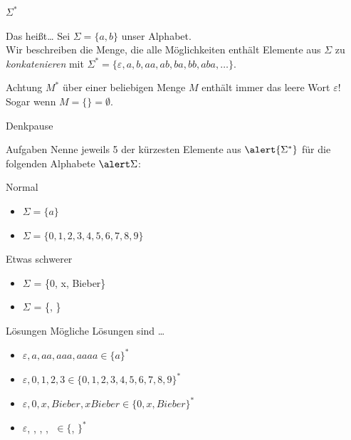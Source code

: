 \documentclass[10pt]{beamer}
\newcommand{\emptyWord}{\varepsilon}
\begin{document}
\begin{frame}[fragile]{$\Sigma^\ast$}
    \begin{exampleblock}{Das heißt\dots}
    Sei $\Sigma = \{a,b\}$ unser \alert{Alphabet}.\\
    Wir beschreiben die Menge, die alle Möglichkeiten enthält Elemente aus $\Sigma$ zu \emph{konkatenieren} mit $\Sigma^\ast=\{\emptyWord,a,b,aa,ab,ba,bb,aba,\dots\}$.
    \end{exampleblock}\pause
    
    \begin{alertblock}{Achtung}
    $M^\ast$ über einer beliebigen Menge $M$ enthält immer das leere Wort $\emptyWord$!\\
    Sogar wenn $M = \{\} = \emptyset$.\\
    
    \end{alertblock}
\end{frame}

{
\begin{frame}[fragile]{Denkpause}
    \begin{alertblock}{Aufgaben}
    Nenne jeweils 5 der kürzesten Elemente aus $\alert{\Sigma^{*}}$ für die folgenden Alphabete $\alert\Sigma$:
    \end{alertblock}
    
    \begin{block}{Normal}
        \begin{itemize}
            \item $\Sigma = \{a\}$
            \item $\Sigma = \{0, 1, 2, 3, 4, 5, 6, 7, 8, 9\}$
        \end{itemize}
    \end{block}
    \begin{block}{Etwas schwerer}
        \begin{itemize}
            \item $\Sigma$ = \{0, x, Bieber\}
            \item $\Sigma$ = \{\Smiley, \Frowny\}
        \end{itemize}
    \end{block}
\end{frame}
}

{
\begin{frame}{Lösungen}
    Mögliche Lösungen sind \dots
  \begin{itemize}[<+- | alert@+>]
        \item $\emptyWord, a, aa, aaa, aaaa \in \{a\}^{*}$
        \item $\emptyWord, 0, 1, 2, 3\in \{0,1,2,3,4,5,6,7,8,9\}^{*}$
        \item $\emptyWord, 0, x, Bieber, xBieber \in \{0, x, Bieber\}^{*}$
        \item $\emptyWord$, \Smiley, \Frowny, \Smiley\Smiley, \Smiley\Frowny$\; \in \{$\Smiley, \Frowny$\}^{*}$
    \end{itemize}
\end{frame}
}
\end{document}

